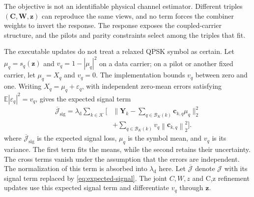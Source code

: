 \documentclass[conference]{IEEEtran}
\newcommand{\Kset}{\mathcal{K}}
\newcommand{\E}{\mathbb{E}}
\newcommand{\norm}[1]{\left\lVert #1\right\rVert}
\begin{document}
The objective is not an identifiable physical channel estimator.  Different
triples \((\mathbf C,\mathbf W,\mathbf z)\) can reproduce the same views,
and no term forces the combiner weights to invert the response.  The
response exposes the coupled-carrier structure, and the pilots and parity
constraints select among the triples that fit.

The executable updates do not treat a relaxed QPSK symbol as certain.  Let
\(\mu_q=s_q(\mathbf z)\) and \(v_q=1-|\mu_q|^2\) on a data carrier; on a
pilot or another fixed carrier, let \(\mu_q=X_q\) and \(v_q=0\).  The
implementation bounds \(v_q\) between zero and one.  Writing
\(X_q=\mu_q+\varepsilon_q\), with independent zero-mean errors satisfying
\(\E|\varepsilon_q|^2=v_q\), gives the expected signal term
\begin{equation}
  \begin{aligned}
    \overline{\mathcal J}_{\mathrm{sig}}
    =\lambda_{\mathrm d}\sum_{k\in\Kset}
    \Bigg[
    &\Big\|\mathbf Y_k-\sum_{q\in\mathcal B_K(k)}
      \mathbf c_{k,q}\mu_q\Big\|_2^2\\
    &+\sum_{q\in\mathcal B_K(k)}
      v_q\norm{\mathbf c_{k,q}}_2^2
    \Bigg].
  \end{aligned}
  \label{eq:expected-signal}
\end{equation}
where \(\overline{\mathcal J}_{\mathrm{sig}}\) is the expected signal loss,
\(\mu_q\) is the symbol mean, and \(v_q\) is its variance.  The first term
fits the means, while the second retains their uncertainty.
The cross terms vanish under the assumption that the errors are independent.  The
normalization of this term is absorbed into \(\lambda_{\mathrm d}\) here.
Let \(\overline{\mathcal J}\) denote \(\mathcal J\) with its signal term
replaced by \eqref{eq:expected-signal}.  The joint \(C,W,z\) and C,z
refinement updates use this expected signal term and differentiate \(v_q\)
through \(\mathbf z\).
\end{document}
